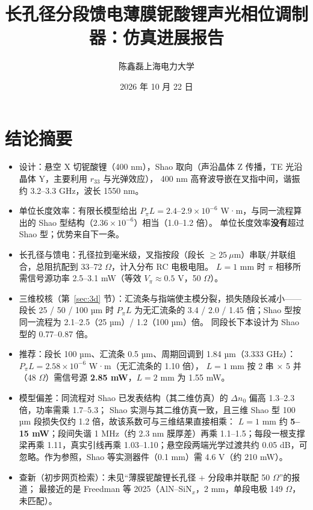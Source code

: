 \documentclass[10pt,a4paper]{article}
\title{\textbf{长孔径分段馈电薄膜铌酸锂声光相位调制器：仿真进展报告}}
\author{陈鑫磊\quad 上海电力大学}
\date{2026 年 10 月 22 日}
\newcommand{\dn}{\Delta n_0}
\begin{document}
\maketitle

\noindent{}

\section{结论摘要}
\begin{itemize}
  \item 设计：悬空 X 切铌酸锂（400 nm），Shao 取向（声沿晶体 Z 传播，TE 光沿晶体 Y，主要利用 $r_{33}$ 与光弹效应），
        400 nm 高脊波导嵌在叉指中间，谐振约 3.2--3.3 GHz，波长 1550 nm。
  \item 单位长度效率：有限长模型给出 $P_\pi L = 2.4$--$2.9\times10^{-6}$ W·m，与同一流程算出的 Shao 型结构（$2.36\times10^{-6}$）相当（1.0--1.2 倍）。
        单位长度效率\textbf{没有}超过 Shao 型；优势来自下一条。
  \item 长孔径与馈电：孔径拉到毫米级，叉指按段（段长 $\ge 25\ \mu$m）串联/并联组合，总阻抗配到 33--72 $\Omega$，计入分布 RC 电极电阻。
        $L = 1$ mm 时 $\pi$ 相移所需信号源功率 2.5--3.1 mW（等效 $V_\pi \approx 0.5$ V，50 $\Omega$）。
  \item 三维校核（第~\ref{sec:3d} 节）：汇流条与指端使主模分裂，损失随段长减小——段长 25 / 50 / 100 µm 时
        $P_\pi L$ 为无汇流条的 3.4 / 2.0 / 1.45 倍；Shao 型按同一流程为 2.1--2.5（25 µm）/ 1.2（100 µm）倍。
        同段长下本设计为 Shao 型的 0.77--0.87 倍。
  \item 推荐：段长 100 µm、汇流条 0.5 µm、周期回调到 1.84 µm（3.333 GHz）：$P_\pi L = 2.58\times10^{-6}$ W·m（无汇流条的 1.10 倍），
        $L = 1$ mm 按 2 串 × 5 并（48 $\Omega$）需信号源 \textbf{2.85 mW}，$L = 2$ mm 为 1.55 mW。
  \item 模型偏差：同流程对 Shao 已发表结构（其二维仿真）的 $\dn$ 偏高 1.3--2.3 倍，功率需乘 1.7--5.3；
        Shao 实测与其二维仿真一致，且三维 Shao 型 100 µm 段损失仅约 1.2 倍，故该系数可与三维结果直接相乘：
        $L = 1$ mm 约 \textbf{5--15 mW}；段间失谐 1 MHz（约 2.3 nm 膜厚差）再乘 1.1--1.5；每段一根支撑梁再乘 1.11，真实引线再乘 1.03--1.10；悬空段两端光学过渡共约 0.05 dB，可忽略。作为参照，Shao 等实测器件（0.1 mm）需 4.6 V（约 210 mW）。
  \item 查新（初步网页检索）：未见“薄膜铌酸锂长孔径 + 分段串并联配 50 $\Omega$”的报道；
        最接近的是 Freedman 等 2025（AlN--SiN$_x$，2 mm，单段电极 149 $\Omega$，未匹配）。
\end{itemize}
\end{document}
